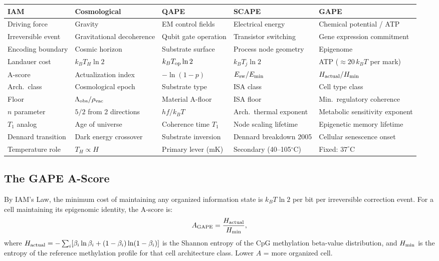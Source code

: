 \documentclass[12pt,a4paper]{article}
\begin{document}
\begin{center}
\renewcommand{\arraystretch}{1.3}
\begin{tabular}{p{2.0cm}p{2.6cm}p{2.6cm}p{2.6cm}p{2.6cm}}
\toprule
\textbf{IAM} & \textbf{Cosmological} & \textbf{QAPE} & \textbf{SCAPE} & \textbf{GAPE} \\
\midrule
Driving force & Gravity & EM control fields & Electrical energy & Chemical potential / ATP \\
Irreversible event & Gravitational decoherence & Qubit gate operation & Transistor switching & Gene expression commitment \\
Encoding boundary & Cosmic horizon & Substrate surface & Process node geometry & Epigenome \\
Landauer cost & $k_B T_H \ln 2$ & $k_B T_{\rm op}\ln 2$ & $k_B T_j\ln 2$ & ATP ($\approx 20\,k_BT$ per mark) \\
A-score & Actualization index & $-\ln(1-p)$ & $E_{\rm sw}/E_{\rm min}$ & $H_{\rm actual}/H_{\rm min}$ \\
Arch.\ class & Cosmological epoch & Substrate type & ISA class & Cell type class \\
Floor & $\Lambda_{\rm obs}/\rho_{\rm vac}$ & Material A-floor & ISA floor & Min.\ regulatory coherence \\
$n$ parameter & $5/2$ from 2 directions & $hf/k_B T$ & Arch.\ thermal exponent & Metabolic sensitivity exponent \\
$T_1$ analog & Age of universe & Coherence time $T_1$ & Node scaling lifetime & Epigenetic memory lifetime \\
Dennard transition & Dark energy crossover & Substrate inversion & Dennard breakdown 2005 & Cellular senescence onset \\
Temperature role & $T_H \propto H$ & Primary lever (mK) & Secondary (40--105$^\circ$C) & Fixed: $37^\circ$C \\
\bottomrule
\end{tabular}
\end{center}

\subsection{The GAPE A-Score}

By IAM's Law, the minimum cost of maintaining any organized information
state is $k_B T \ln 2$ per bit per irreversible correction event.
For a cell maintaining its epigenomic identity, the A-score is:
\begin{equation}
A_{\rm GAPE} = \frac{H_{\rm actual}}{H_{\rm min}},
\label{eq:gape}
\end{equation}
where $H_{\rm actual} = -\sum_i [\beta_i\ln\beta_i + (1-\beta_i)\ln(1-\beta_i)]$
is the Shannon entropy of the CpG methylation beta-value distribution,
and $H_{\rm min}$ is the entropy of the reference methylation profile
for that cell architecture class. Lower $A$ = more organized cell.
\end{document}
